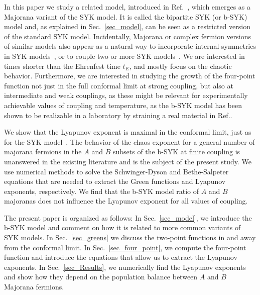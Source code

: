 In this paper we study a related model, introduced in Ref.~\cite{Fremling_2022,fremling_bipartite_2021}, which emerges as a Majorana variant of the SYK model. 
It is called the bipartite SYK (or b-SYK) model and, as explained in Sec.~\ref{sec_model},
can be seen as a restricted version of the standard SYK model. Incidentally,
Majorana or complex fermion versions of similar models also appear as a natural way to incorporate internal symmetries in SYK models~\cite{lantagne2020diagnosing,Kim2019,sahooTraversableWormholeHawkingPage2020},
or to couple two or more SYK models~\cite{chowdhury_translationally_2018}.
We are interested in times shorter than the Ehrenfest time $t_E$, and mostly focus on the chaotic behavior. Furthermore, we are interested in studying the growth of the four-point function not just in the full conformal limit at strong coupling, but also at intermediate and weak couplings, as these might be relevant for experimentally achievable values of coupling and temperature, as the b-SYK model has been shown to be realizable in a laboratory by straining a real material in Ref.\cite{fremling_bipartite_2021}.
%

We show that the Lyapunov exponent is maximal in the conformal limit, just as for the SYK model~\cite{stanford_many-body_2016,maldacena_bound_2016,maldacena_comments_2016}. The behavior of the chaos exponent for a general number of majorana fermions in the $A$ and $B$ subsets of the b-SYK at finite coupling is unanswered in the existing literature and is the subject of the present study.
We use numerical methods to solve the Schwinger-Dyson and Bethe-Salpeter equations that are needed to extract the Green functions and Lyapunov exponents, respectively.
We find that the b-SYK model ratio of $A$ and $B$ majoranas does not influence the Lyapunov exponent for all values of coupling.



The present paper is organized as follows:
In Sec.~\ref{sec_model}, we introduce the b-SYK model and comment on how it is related to more common variants of SYK models.
In Sec.~\ref{sec_greens} we discuss the two-point functions in and away from the conformal limit. In Sec.~\ref{sec_four_point},
we compute the four-point function and introduce the equations that allow us to extract the Lyapunov exponents. In Sec.~\ref{sec_Results},
we numerically find the Lyapunov exponents and show how they depend on the population balance between $A$ and $B$ Majorana fermions.



